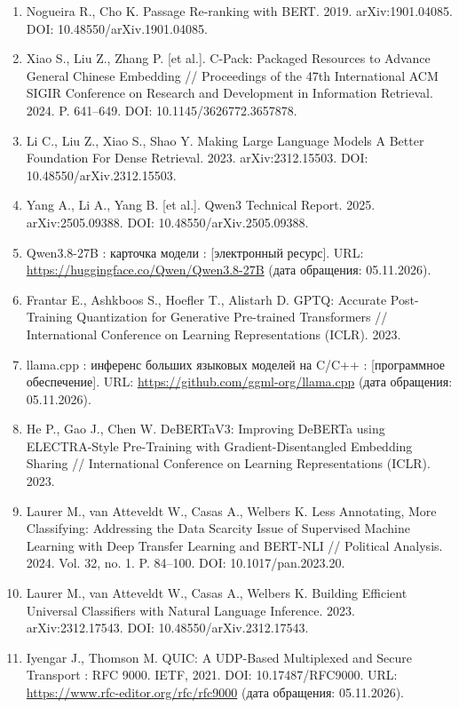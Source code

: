 \documentclass[14pt,a4paper]{extarticle}
\begin{document}
\begin{singlespace*}
\begin{enumerate}
\item \foreignlanguage{english}{Nogueira R., Cho K. Passage Re-ranking with BERT. 2019. arXiv:1901.04085. DOI: 10.48550/arXiv.1901.04085.}
\item \foreignlanguage{english}{Xiao S., Liu Z., Zhang P. [et al.]. C-Pack: Packaged Resources to Advance General Chinese Embedding // Proceedings of the 47th International ACM SIGIR Conference on Research and Development in Information Retrieval. 2024. P. 641–649. DOI: 10.1145/3626772.3657878.}
\item \foreignlanguage{english}{Li C., Liu Z., Xiao S., Shao Y. Making Large Language Models A Better Foundation For Dense Retrieval. 2023. arXiv:2312.15503. DOI: 10.48550/arXiv.2312.15503.}
\item \foreignlanguage{english}{Yang A., Li A., Yang B. [et al.]. Qwen3 Technical Report. 2025. arXiv:2505.09388. DOI: 10.48550/arXiv.2505.09388.}
\item Qwen3.8-27B : карточка модели : [электронный ресурс]. URL: \url{https://huggingface.co/Qwen/Qwen3.8-27B} (дата обращения: 05.11.2026).
\item \foreignlanguage{english}{Frantar E., Ashkboos S., Hoefler T., Alistarh D. GPTQ: Accurate Post-Training Quantization for Generative Pre-trained Transformers // International Conference on Learning Representations (ICLR). 2023.}
\item llama.cpp : инференс больших языковых моделей на C/C++ : [программное обеспечение]. URL: \url{https://github.com/ggml-org/llama.cpp} (дата обращения: 05.11.2026).
\item \foreignlanguage{english}{He P., Gao J., Chen W. DeBERTaV3: Improving DeBERTa using ELECTRA-Style Pre-Training with Gradient-Disentangled Embedding Sharing // International Conference on Learning Representations (ICLR). 2023.}
\item \foreignlanguage{english}{Laurer M., van Atteveldt W., Casas A., Welbers K. Less Annotating, More Classifying: Addressing the Data Scarcity Issue of Supervised Machine Learning with Deep Transfer Learning and BERT-NLI // Political Analysis. 2024. Vol. 32, no. 1. P. 84–100. DOI: 10.1017/pan.2023.20.}
\item \foreignlanguage{english}{Laurer M., van Atteveldt W., Casas A., Welbers K. Building Efficient Universal Classifiers with Natural Language Inference. 2023. arXiv:2312.17543. DOI: 10.48550/arXiv.2312.17543.}
\item Iyengar J., Thomson M. QUIC: A UDP-Based Multiplexed and Secure Transport : RFC 9000. IETF, 2021. DOI: 10.17487/RFC9000. URL: \url{https://www.rfc-editor.org/rfc/rfc9000} (дата обращения: 05.11.2026).

\end{enumerate}
\end{singlespace*}
\end{document}

